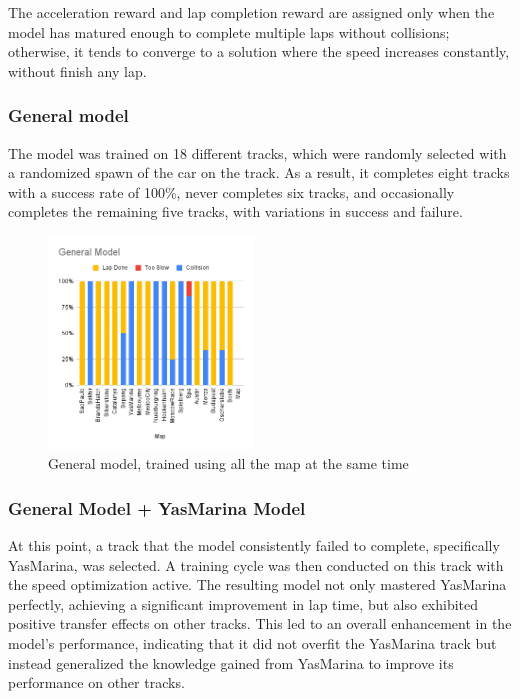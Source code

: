\documentclass[conference]{IEEEtran}
\begin{document}
The acceleration reward and lap completion reward are assigned only when the model has matured enough to complete multiple laps without collisions; otherwise, it tends to converge to a solution where the speed increases constantly, without finish any lap.

%
%
%
\subsubsection{General model}
The model was trained on 18 different tracks, which were randomly selected with a randomized spawn of the car on the track. As a result, it completes eight tracks with a success rate of 100\%, never completes six tracks, and occasionally completes the remaining five tracks, with variations in success and failure.
\begin{figure}[h]
    \centering
    \includegraphics[width=0.485\textwidth]{img/GeneralModel.png}
    \caption{General model, trained using all the map at the same time}
    \label{fig:general_train}
\end{figure}

%
%
%
\subsubsection{General Model + YasMarina Model}
At this point, a track that the model consistently failed to complete, specifically YasMarina, was selected. A training cycle was then conducted on this track with the speed optimization active. The resulting model not only mastered YasMarina perfectly, achieving a significant improvement in lap time, but also exhibited positive transfer effects on other tracks. This led to an overall enhancement in the model's performance, indicating that it did not overfit the YasMarina track but instead generalized the knowledge gained from YasMarina to improve its performance on other tracks.
\end{document}
